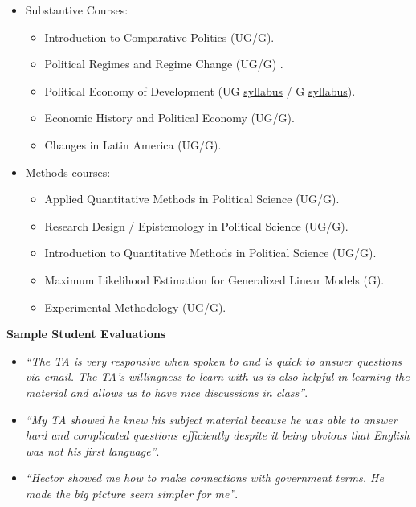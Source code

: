 \documentclass[11pt]{letter} %
\begin{document}
\begin{letter}{}
\begin{itemize}
\item Substantive Courses:
	\begin{itemize}
	\item Introduction to Comparative Politics (UG/G).
	\item Political Regimes and Regime Change (UG/G) .
	\item Political Economy of Development (UG \href{https://github.com/hbahamonde/Pol_Econ_Dev_UGrad/raw/master/Pol_Econ_Dev_Syllabus_UGRAD.pdf}{syllabus}  / G \href{https://github.com/hbahamonde/Pol_Econ_Dev_Grad/raw/master/Pol_Econ_Dev_Syllabus_GRAD.pdf}{syllabus}).
	\item Economic History and Political Economy (UG/G).
	\item Changes in Latin America (UG/G).
	\end{itemize}
\item Methods courses:
	\begin{itemize}
	\item Applied Quantitative Methods in Political Science (UG/G).
	\item Research Design / Epistemology in Political Science (UG/G).
	\item Introduction to Quantitative Methods in Political Science (UG/G).
	\item Maximum Likelihood Estimation for Generalized Linear Models (G).
	\item Experimental Methodology (UG/G).
	\end{itemize}
\end{itemize}


{\bf Sample Student Evaluations}
{\scriptsize
\begin{itemize}

\item \emph{``The TA is very responsive when spoken to and is quick to answer questions via email. The TA's willingness to learn with us is also helpful in learning the material and allows us to have nice discussions in class''}.

\item \emph{``My TA showed he knew his subject material because he was able to answer hard and complicated questions efficiently despite it being obvious that English was not his first language''}.

\item \emph{``Hector showed me how to make connections with government terms. He made the big picture seem simpler for me''}.


\end{itemize}}
\end{letter}
\end{document}
